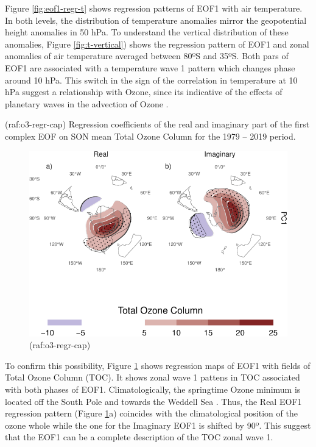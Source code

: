 \documentclass[smallextended]{svjour3}       %
\begin{document}
Figure \ref{fig:eof1-regr-t} shows regression patterns of EOF1 with air temperature. In both levels, the distribution of temperature anomalies mirror the geopotential height anomalies in 50 hPa. To understand the vertical distribution of these anomalies, Figure \ref{fig:t-vertical}) shows the regression pattern of EOF1 and zonal anomalies of air temperature averaged between 80ºS and 35ºS. Both pars of EOF1 are associated with a temperature wave 1 pattern which changes phase around 10 hPa. This switch in the sign of the correlation in temperature at 10 hPa suggest a relationship with Ozone, since its indicative of the effects of planetary waves in the advection of Ozone \citep{hartmann1979, rood1985, smith1995}.

(raf:o3-regr-cap) Regression coefficients of the real and imaginary part of the first complex EOF on SON mean Total Ozone Column for the 1979 -- 2019 period.

\begin{figure}
\centering
\includegraphics{../figures/o3-regr-1.pdf}
\caption{\label{fig:o3-regr}(raf:o3-regr-cap)}
\end{figure}

To confirm this possibility, Figure \ref{fig:o3-regr} shows regression maps of EOF1 with fields of Total Ozone Column (TOC). It shows zonal wave 1 pattens in TOC associated with both phases of EOF1. Climatologically, the springtime Ozone minimum is located off the South Pole and towards the Weddell Sea \citep{wirth1993}. Thus, the Real EOF1 regression pattern (Figure \ref{fig:o3-regr}a) coincides with the climatological position of the ozone whole while the one for the Imaginary EOF1 is shifted by 90º. This suggest that the EOF1 can be a complete description of the TOC zonal wave 1.
\end{document}
